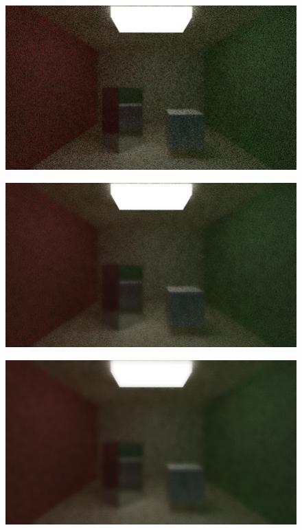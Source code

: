 \documentclass[titlepage,12pt]{report}
\begin{document}
\begin{appendices}
\begin{figure}[H]
	\centering
	\includegraphics[scale=0.5]{media/bilateral/cornell_normal_10_bilateral_filter_21_15_10.png}
	\label{ap25}
\end{figure}

\begin{figure}[H]
	\centering
	\includegraphics[scale=0.5]{media/bilateral/cornell_normal_10_bilateral_filter_21_15_20.png}
	\label{ap26}
\end{figure}

\begin{figure}[H]
	\centering
	\includegraphics[scale=0.5]{media/bilateral/cornell_normal_10_bilateral_filter_21_15_40.png}
	\label{ap27}
\end{figure}


\end{appendices}
\end{document}
